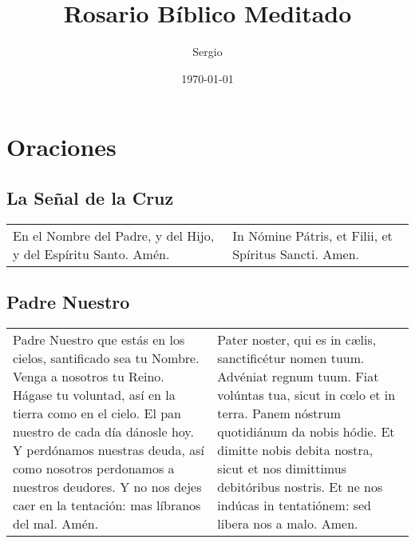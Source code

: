 \documentclass[11pt,a4paper]{book}
\title{Rosario Bíblico Meditado}
\author{Sergio}
\date{\today}
\begin{document}
    \begin{titlepage}
    \maketitle        
    \end{titlepage}

    \chapter*{Oraciones}

    \section*{La Señal de la Cruz}\label{sec:senal-cruz}
    \begin{longtable} { p{} p{} }
        En el Nombre del Padre, y del Hijo, y del Espíritu Santo. Amén.
        
        &
        
        In Nómine Pátris, et Filii, et Spíritus Sancti. Amen.
    \end{longtable}

    \section*{Padre Nuestro}\label{sec:paternoster}
    \begin{longtable} { p{} p{} }
        Padre Nuestro que estás en los cielos, santificado sea tu Nombre. Venga a nosotros tu Reino. 
        Hágase tu voluntad, así en la tierra como en el cielo. El pan nuestro de cada día dánosle hoy. 
        Y perdónamos nuestras deuda, así como nosotros perdonamos a nuestros deudores. 
        Y no nos dejes caer en la tentación: mas líbranos del mal. Amén.
        
        &
        
        Pater noster, qui es in cælis, sanctificétur nomen tuum. Advéniat regnum tuum. 
        Fiat volúntas tua, sicut in cœlo et in terra. Panem nóstrum quotidiánum da nobis hódie. 
        Et dimitte nobis debita nostra, sicut et nos dimittimus debitóribus nostris. 
        Et ne nos indúcas in tentatiónem: sed libera nos a malo. Amen.
    \end{longtable}
\end{document}
